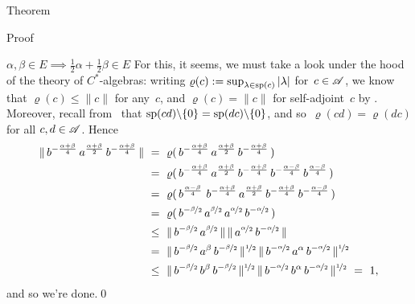 \documentclass[a]{subfiles}
\begin{document}
\begin{parsec}
\begin{point}{Theorem}
\begin{point}{Proof}
\begin{point}{$\alpha,\beta\in E\implies \frac{1}{2}\alpha+\frac{1}{2}\beta
	\in E$}
For this, it seems, we must take a look under the hood
of the theory of $C^*$-algebras:
writing $\varrho(c):=\sup_{\lambda\in \mathrm{sp}(c)}\left|\lambda \right|$
for~$c\in \mathscr{A}$,
we know that $\varrho(c)\leq \|c\|$ for any~$c$,
and $\varrho(c)=\|c\|$ for self-adjoint~$c$ by .
Moreover, recall from~
that $\mathrm{sp}(cd)\backslash\{0\}
=\mathrm{sp}(dc)\backslash\{0\}$,
and so~$\varrho(cd)=\varrho(dc)$
for all $c,d\in \mathscr{A}$.
Hence
\begin{alignat*}{3}
\|\,b^{-\frac{\alpha+\beta}{4}}\,a^{\frac{\alpha+\beta}{2}}\,
b^{-\frac{\alpha+\beta}{4}}\,\| 
\ &=\ 
\varrho(\,b^{-\frac{\alpha+\beta}{4}}\,a^{\frac{\alpha+\beta}{2}}\,
b^{-\frac{\alpha+\beta}{4}} \,) \\
&=\ 
\varrho(\,b^{-\frac{\alpha+\beta}{4}}\,a^{\frac{\alpha+\beta}{2}}\,
b^{-\frac{\alpha+\beta}{4}} \,b^{-\frac{\alpha-\beta}{4}}
\,b^{\frac{\alpha-\beta}{4}}\,) \\
&=\ 
\varrho(
\,b^{\frac{\alpha-\beta}{4}}\,
\,b^{-\frac{\alpha+\beta}{4}}\,a^{\frac{\alpha+\beta}{2}}\,
b^{-\frac{\alpha+\beta}{4}} \,b^{-\frac{\alpha-\beta}{4}}\,)\\
&=\ 
\varrho(
\,b^{-\nicefrac{\beta}{2}}\,a^{\nicefrac{\beta}{2}}\,
a^{\nicefrac{\alpha}{2}}\,
b^{-\nicefrac{\alpha}{2}} \,) \\
&\leq\ 
\|\,b^{-\nicefrac{\beta}{2}}\,a^{\nicefrac{\beta}{2}}\,\|
\,\|\,
a^{\nicefrac{\alpha}{2}}\,
b^{-\nicefrac{\alpha}{2}} \,\|\\
&=\ 
\|\,b^{-\nicefrac{\beta}{2}}\,a^{\beta}\,
b^{-\nicefrac{\beta}{2}}\,\|^{\nicefrac{1}{2}}
\,\|\,
b^{-\nicefrac{\alpha}{2}} \,a^\alpha\,
b^{-\nicefrac{\alpha}{2}} \,\|^{\nicefrac{1}{2}}\\
\ &\leq\ 
\|\,b^{-\nicefrac{\beta}{2}}\,b^{\beta}\,
b^{-\nicefrac{\beta}{2}}\,\|^{\nicefrac{1}{2}}
\,\|\,
b^{-\nicefrac{\alpha}{2}} \,b^\alpha\,
b^{-\nicefrac{\alpha}{2}} \,\|^{\nicefrac{1}{2}} \ = \ 1,
\end{alignat*}
and so we're done.\qed
\end{point}
\end{point}
\end{point}
\end{parsec}
\end{document}
